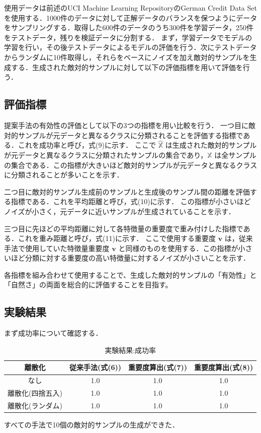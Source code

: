 使用データは前述のUCI Machine Learning RepositoryのGerman Credit Data Setを使用する．1000件のデータに対して正解データのバランスを保つようにデータをサンプリングする．取得した600件のデータのうち300件を学習データ，250件をテストデータ，残りを検証データに分割する．
まず，学習データでモデルの学習を行い，その後テストデータによるモデルの評価を行う．次にテストデータからランダムに10件取得し，それらをベースにノイズを加え敵対的サンプルを生成する．生成された敵対的サンプルに対して以下の評価指標を用いて評価を行う．

\subsection{評価指標}
提案手法の有効性の評価として以下の3つの指標を用い比較を行う．
一つ目に敵対的サンプルが元データと異なるクラスに分類されることを評価する指標である．これを成功率と呼び，式(9)に示す．
ここで $\hat{\mathbb{X}}$ は生成された敵対的サンプルが元データと異なるクラスに分類されたサンプルの集合であり，$\mathbb{X}$ は全サンプルの集合である．この指標が大きいほど敵対的サンプルが元データと異なるクラスに分類されることが多いことを示す．

二つ目に敵対的サンプル生成前のサンプルと生成後のサンプル間の距離を評価する指標である．これを平均距離と呼び，式(10)に示す．
この指標が小さいほどノイズが小さく，元データに近いサンプルが生成されていることを示す．

三つ目に先ほどの平均距離に対して各特徴量の重要度で重み付けした指標である．これを重み距離と呼び，式(11)に示す．
ここで使用する重要度 $\bm{v}$ は，従来手法で使用していた特徴量重要度 $\bm{v}$ と同様のものを使用する．この指標が小さいほど分類に対する重要度の高い特徴量に対するノイズが小さいことを示す．

各指標を組み合わせて使用することで、生成した敵対的サンプルの「有効性」と「自然さ」の両面を総合的に評価することを目指す。

\subsection{実験結果}
まず成功率について確認する．
\begin{table}[H]
    \centering
    \caption{実験結果:成功率}
    \begin{tabular}{|c|c|c|c|} \hline
        離散化 & 従来手法(式(6)) & 重要度算出(式(7)) & 重要度算出(式(8)) \\ \hline
        なし & 1.0 & 1.0 & 1.0 \\ \hline
        離散化(四捨五入) & 1.0 & 1.0 & 1.0 \\ \hline
        離散化(ランダム) & 1.0 & 1.0 & 1.0 \\ \hline
    \end{tabular}
\end{table}
すべての手法で10個の敵対的サンプルの生成ができた．

